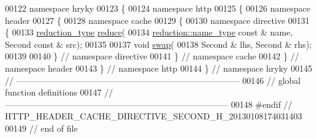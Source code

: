 \begin{DoxyCode}
00122 \textcolor{keyword}{namespace }hryky
00123 \{
00124 \textcolor{keyword}{namespace }http
00125 \{
00126 \textcolor{keyword}{namespace }header
00127 \{
00128 \textcolor{keyword}{namespace }cache
00129 \{
00130 \textcolor{keyword}{namespace }directive
00131 \{
00133     \hyperlink{namespacehryky_a343a9a4c36a586be5c2693156200eadc}{reduction_type} \hyperlink{namespacehryky_1_1http_a08fc36a78a8e2908140fcd102829a566}{reduce}(
00134         \hyperlink{namespacehryky_1_1reduction_ac686c30a4c8d196bbd0f05629a6b921f}{reduction::name_type} \textcolor{keyword}{const} & name, Second \textcolor{keyword}{const} & src);
00135 
00137     \textcolor{keywordtype}{void} \hyperlink{namespacehryky_1_1http_a38e62595ad532d18fbc65ceb61973aec}{swap}(
00138         Second & lhs, Second & rhs);
00139 
00140 \} \textcolor{comment}{// namespace directive}
00141 \} \textcolor{comment}{// namespace cache}
00142 \} \textcolor{comment}{// namespace header}
00143 \} \textcolor{comment}{// namespace http}
00144 \} \textcolor{comment}{// namespace hryky}
00145 \textcolor{comment}{//
      ------------------------------------------------------------------------------}
00146 \textcolor{comment}{// global function definitions}
00147 \textcolor{comment}{//
      ------------------------------------------------------------------------------}
00148 \textcolor{preprocessor}{#endif // HTTP\_HEADER\_CACHE\_DIRECTIVE\_SECOND\_H\_20130108174031403}
00149 \textcolor{preprocessor}{}\textcolor{comment}{// end of file}
\end{DoxyCode}
